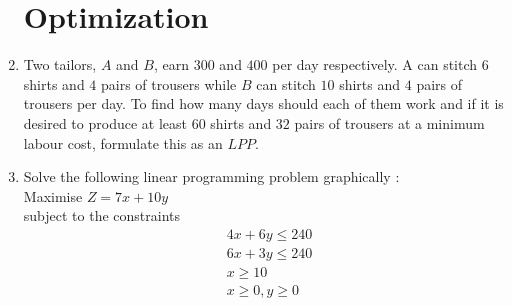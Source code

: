 \documentclass[10pt,-letter paper]{article}
\begin{document}
\begin{enumerate}
\section{Optimization}
\item Two tailors, $A$ and $B$, earn \rupee $300$ and \rupee $400$ per day respectively. A can stitch $6$ shirts and $4$ pairs of trousers while $B$ can stitch $10$ shirts and $4$ pairs of trousers per day. To find how many days should each of them work and if it is desired to produce at least $60$ shirts and $32$ pairs of trousers at a minimum labour cost, formulate this as an $LPP$.
\item Solve the following linear programming problem graphically :
\\Maximise $Z=7x+10y$
\\subject to the constraints
\begin{align*}
& 4x+6y \leq 240 \\
& 6x+3y \leq 240 \\
& x \geq 10 \\
& x \geq 0, y \geq 0
\end{align*}
\end{enumerate}
\end{document}
